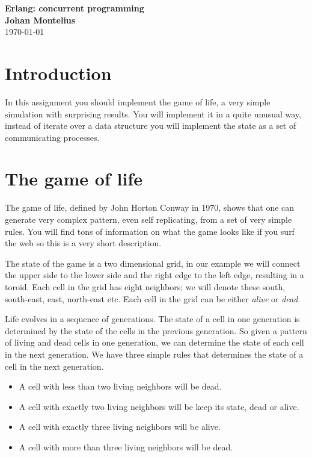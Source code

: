 \documentclass[a4paper,11pt]{article}
\newcommand{\nnsection}[1]{
\section*{#1}
\addcontentsline{toc}{section}{#1}
}
\begin{document}
\begin{center}
\vspace{20pt}
\textbf{\large Erlang: concurrent programming}\\
\vspace{10pt}
\textbf{Johan Montelius}\\
\vspace{10pt}
\today{}
\end{center}

\nnsection{Introduction}

In this assignment you should implement the game of life, a very
simple simulation with surprising results. You will implement it in a
quite unusual way, instead of iterate over a data structure you will
implement the state as a set of communicating processes.

\section{The game of life}

The game of life, defined by John Horton Conway in 1970, shows that
one can generate very complex pattern, even self replicating, from a
set of very simple rules. You will find tons of information on what
the game looks like if you surf the web so this is a very short
description.

The state  of the game  is a two  dimensional grid, in our  example we
will connect the  upper side to the lower side and the right edge to
the left edge, resulting in a toroid. Each cell in the grid has eight
neighbors; we  will denote  these south, south-east, east, north-east
etc. Each cell in the grid can be either {\em alive } or {\em dead}.

Life evolves in a sequence of generations. The state of a cell in one
generation is determined by the state of the cells in the previous
generation. So given a pattern of living and dead cells in one
generation, we can determine the state of each cell in the next
generation. We have three simple rules that determines the state of a
cell in the next generation.

\begin{itemize}
\item A cell with less than two living neighbors will be dead.
\item A cell with exactly two living neighbors will be keep its state, dead or alive.
\item A cell with exactly three living neighbors will be alive.
\item A cell with more than three living neighbors will be dead.
\end{itemize}
\end{document}
